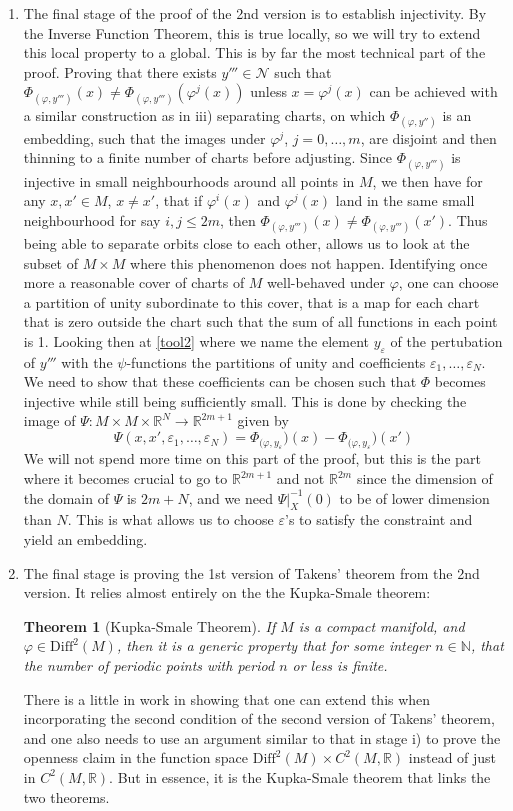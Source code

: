 \documentclass[11pt, a4paper]{memoir}
\theoremstyle{break}
\newtheorem{thm}{Theorem}
\theoremstyle{break}
\theoremstyle{nonumberplain}
\newcommand{\mN}{\mathbb{N}}
\newcommand{\mR}{\mathbb{R}}
\begin{document}
\begin{enumerate}[label=\roman*)]
	\item The final stage of the proof of the 2nd version is to establish injectivity. By the Inverse Function Theorem, this is true locally, so we will try to extend this local property to a global. This is by far the most technical part of the proof. Proving that there exists $y'''\in \mathcal{N}$ such that $\Phi_{(\varphi,y''')}(x)\neq \Phi_{(\varphi, y''')}(\varphi^j(x))$ unless $x=\varphi^j(x)$ can be achieved with a similar construction as in iii) separating charts, on which $\Phi_{(\varphi,y'')}$ is an embedding, such that the images under $\varphi^j$, $j=0,\ldots,m$, are disjoint and then thinning to a finite number of charts before adjusting. Since $\Phi_{(\varphi,y''')}$ is injective in small neighbourhoods around all points in $M$, we then have for any $x,x'\in M$, $x\neq x'$, that if $\varphi^i(x)$ and $\varphi^j(x)$ land in the same small neighbourhood for say $i,j\leqslant 2m$, then $\Phi_{(\varphi,y''')}(x)\neq \Phi _{(\varphi,y''')}(x')$. Thus being able to separate orbits close to each other, allows us to look at the subset of $M\times M$ where this phenomenon does not happen. Identifying once more a reasonable cover of charts of $M$ well-behaved under $\varphi$, one can choose a partition of unity subordinate to this cover, that is a map for each chart that is zero outside the chart such that the sum of all functions in each point is 1. Looking then at \ref{tool2} where we name the element $y_{\varepsilon}$ of the pertubation of $y'''$ with the $\psi$-functions the partitions of unity and coefficients $\varepsilon_1,\ldots,\varepsilon_N$. We need to show that these coefficients can be chosen such that $\Phi$ becomes injective while still being sufficiently small. This is done by checking the image of $\Psi:M\times M\times \mR^N\to\mR^{2m+1}$ given by
	$$\Psi(x,x',\varepsilon_1,\ldots,\varepsilon_N)=\Phi_{(\varphi,y_{\varepsilon}})(x)-\Phi_{(\varphi,y_{\varepsilon}})(x')$$
	We will not spend more time on this part of the proof, but this is the part where it becomes crucial to go to $\mR^{2m+1}$ and not $\mR^{2m}$ since the dimension of the domain of $\Psi$ is $2m+N$, and we need $\Psi|_{X}^{-1}(0)$ to be of lower dimension than $N$. This is what allows us to choose $\varepsilon$'s to satisfy the constraint and yield an embedding. 
	\item The final stage is proving the 1st version of Takens' theorem from the 2nd version. It relies almost entirely on the the Kupka-Smale theorem:
	\begin{thm}[Kupka-Smale Theorem]
	If $M$ is a compact manifold, and $\varphi\in \text{Diff}^2(M)$, then it is a generic property that for some integer $n\in \mN$, that the number of periodic points with period $n$ or less is finite.
	\end{thm}
	There is a little in work in showing that one can extend this when incorporating the second condition of the second version of Takens' theorem, and one also needs to use an argument similar to that in stage i) to prove the openness claim in the function space $\text{Diff}^2(M)\times C^2(M,\mR)$ instead of just in $C^2(M,\mR)$. But in essence, it is the Kupka-Smale theorem that links the two theorems.
\end{enumerate}  
\end{document}
